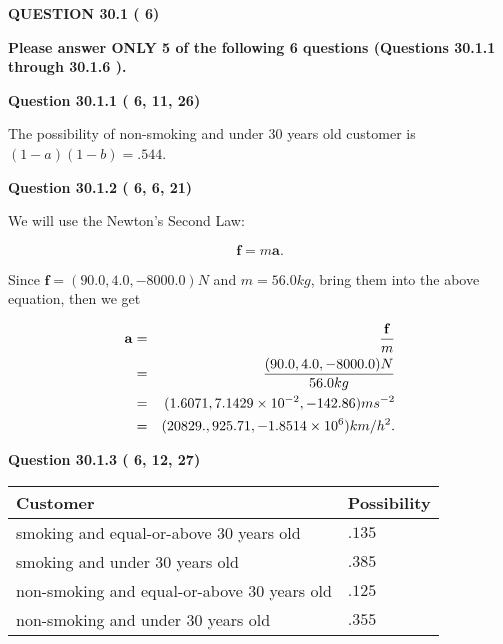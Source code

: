 \documentclass[12pt]{article}
\begin{document}
{\textbf{\Large{QUESTION
30.1 
 (          6)
}}}
  
  
{\textbf{\Large{Please answer ONLY  %
           5 %
 of the following  %
           6 %
 questions (Questions  %
30.1.1 %
 through  %
30.1.6 %
 ). }}}
   
   
  
\vspace{0.2in}
  
{\textbf{\Large{Question
30.1.1 
 (          6,         11,         26)
}}}
  
  
 
 
\noindent{}

The possibility of  %
 non-smoking and  %
under 30 years old
customer is $ (1-a)(1-b) =  %
.544 $.
 
 
  
\vspace{0.2in}
  
{\textbf{\Large{Question
30.1.2 
 (          6,          6,         21)
}}}
  
  
 
 
\noindent{}

We will use the Newton's Second Law:
 
\[
\mathbf{f}=m\mathbf{a}.
\]
 
Since $\mathbf{f}=( %
90.0,  %
4.0,  %
-8000.0 )N$
and $m= %
56.0 kg$, bring them into the above equation, then we get
 
\begin{eqnarray*}
\mathbf{a}&=&\frac{\mathbf{f}}m  \\
&=&\frac{(
90.0 ,
4.0 ,
-8000.0 )N
}{ %
56.0 kg}  \\
&=&(
1.6071 ,
7.1429 \times 10^{-2},
-142.86
)ms^{-2} \\
&=&(
20829. ,
925.71 ,
-1.8514 \times 10^{6}
)km/h^2.
\end{eqnarray*}
 
 
 
  
\vspace{0.2in}
  
{\textbf{\Large{Question
30.1.3 
 (          6,         12,         27)
}}}
  
  
 
 
\noindent{}

 
\noindent
\begin{tabular}{|l|l|}
\hline
Customer & Possibility \\
\hline
smoking  and  %
equal-or-above 30 years old &
  $ %
.135$ \\
\hline
smoking  and  %
under 30 years old &
  $ %
.385$ \\
\hline
 non-smoking and  %
equal-or-above 30 years old &
  $ %
.125$ \\
\hline
 non-smoking and  %
under 30 years old &
  $ %
.355$ \\
\hline
\end{tabular}
 
\end{document}
